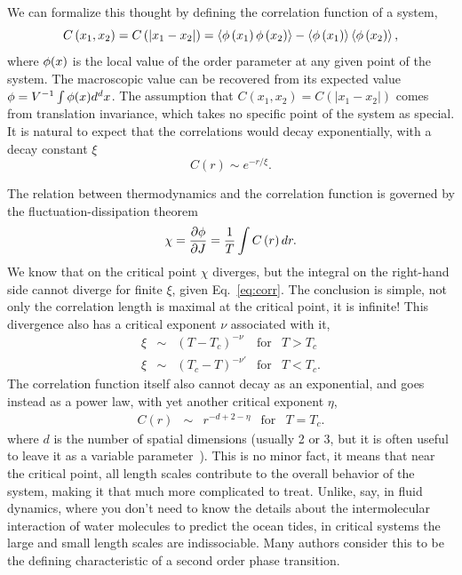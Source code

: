 We can formalize this thought by defining the correlation function of a system,
\begin{equation}
    \label{eq:corr}
    C\left(x_{1},x_{2}\right)=
    C\left(\left|x_{1}-x_{2}\right|\right)=
    \left\langle \phi\left(x_{1}\right)\phi\left(x_{2}\right)\right\rangle 
    -\left\langle \phi\left(x_{1}\right)\right\rangle
    \left\langle \phi\left(x_{2}\right)\right\rangle,
\end{equation}
where $\phi(x)$ is the local value of the order parameter at any given point of
the system. The macroscopic value can be recovered from its expected value
$\phi=V^{-1}\int\phi(x)d^d x$. The assumption that
$C\left(x_{1},x_{2}\right)=C\left(\left|x_{1}-x_{2}\right|\right)$ comes from
translation invariance, which takes no specific point of the system as special.
It is natural to expect that the correlations would decay exponentially, with a
decay constant $\xi$
\begin{equation}
    \label{eq:corr}
    C\left(r\right)\sim e^{-r/\xi}.
\end{equation}

The relation between thermodynamics and the correlation function is governed
by the fluctuation-dissipation theorem
\begin{equation}
    \chi=\frac{\partial\phi}{\partial J}=\frac{1}{T}\int C\left(r\right)dr.
\end{equation}
We know that on the critical point $\chi$ diverges, but  the integral on the
right-hand side cannot diverge for finite $\xi$, given Eq.~\ref{eq:corr}.
The conclusion is simple, not only the correlation length is maximal at the
critical point, it is infinite! This divergence also has a critical exponent
$\nu$ associated with it,
\begin{equation}
    \label{eq:corlen}
    \begin{array}{ccccc}
        \xi & \sim & {\left(T-T_c\right)}^{-\nu}  & \mbox{for} & T > T_c \\
        \xi & \sim & {\left(T_c-T\right)}^{-\nu'} & \mbox{for} & T < T_c.
    \end{array}
\end{equation}
The correlation function itself also cannot decay as an exponential, and goes
instead as a power law, with yet another critical exponent $\eta$,
\begin{equation}
    \label{eq:critcor}
    \begin{array}{ccccc}
        C(r) & \sim & r^{-d+2-\eta} & \mbox{for} & T = T_c.
    \end{array}
\end{equation}
where $d$ is the number of spatial dimensions (usually 2 or 3, but it is often
useful to leave it as a variable parameter~\cite{Wilson1972}). This is no minor
fact, it means that near the critical point, all length scales contribute to
the overall behavior of the system, making it that much more complicated to
treat. Unlike, say, in fluid dynamics, where you don't need to know the details
about the intermolecular interaction of water molecules to predict the ocean
tides, in critical systems the large and small length scales are indissociable.
Many authors consider this to be the defining characteristic of a second order
phase transition.

